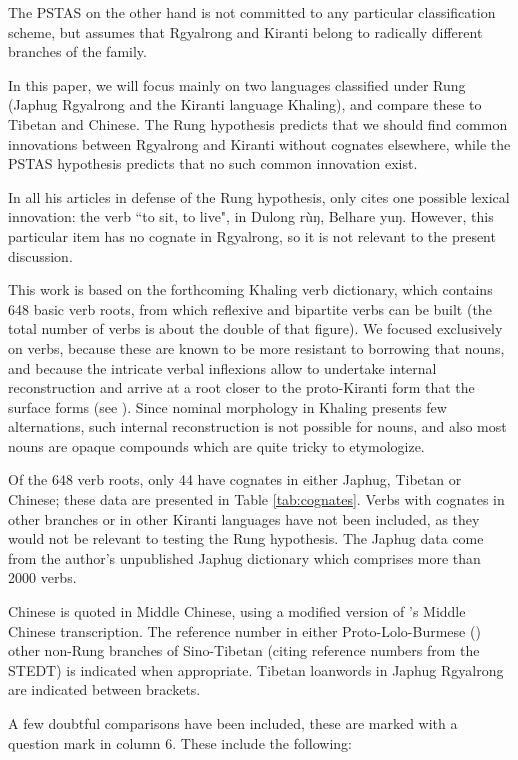 \documentclass[oldfontcommands,oneside,a4paper,11pt]{article}
\newcommand{\ipa}[1]{{\phon #1}} %
\begin{document}
The PSTAS on the other hand is not committed to any particular classification scheme, but assumes that Rgyalrong and Kiranti belong to radically different branches of the family.

In this paper, we will focus mainly on two languages classified under Rung (Japhug Rgyalrong and the Kiranti language Khaling), and compare these to Tibetan and Chinese. The Rung hypothesis predicts that we should find common innovations between Rgyalrong and Kiranti without cognates elsewhere, while the PSTAS hypothesis predicts that no such common innovation exist.

In all his articles in defense of the Rung hypothesis, \citet{lapolla14subgrouping} only cites one possible lexical innovation: the verb ``to sit, to live", in Dulong \ipa{rùŋ}, Belhare \ipa{yuŋ}. However, this particular item has no cognate in Rgyalrong, so it is not relevant to the present discussion.

This work is based on the forthcoming Khaling verb dictionary, which contains 648 basic verb roots, from which reflexive and bipartite verbs can be built (the total number of verbs is about the double of that figure). We focused exclusively on verbs, because these are known to be more resistant to borrowing that nouns, and because the intricate verbal inflexions allow to undertake internal reconstruction and arrive at a root closer to the proto-Kiranti form that the surface forms (see \citealt{jacques12khaling}). Since nominal morphology in Khaling presents few alternations, such internal reconstruction is not possible for nouns, and also most nouns are opaque compounds which are quite tricky to etymologize.

Of the 648 verb roots, only 44 have cognates in either Japhug, Tibetan or Chinese; these data are presented in Table \ref{tab:cognates}. Verbs with cognates in other branches or in other Kiranti languages have not been included, as they would not be relevant to testing the Rung hypothesis. The Japhug data come from the author's unpublished Japhug dictionary which comprises more than 2000 verbs.

Chinese is quoted in Middle Chinese, using a modified version of \citet{baxter92}'s Middle Chinese transcription. 
The reference number in either Proto-Lolo-Burmese (\citealt{bradley79}) other non-Rung branches of Sino-Tibetan (citing reference numbers from the STEDT) is indicated when appropriate. Tibetan loanwords in Japhug Rgyalrong are indicated between brackets.

A few doubtful comparisons have been included, these are marked with a question mark in column 6. These include the following:
\end{document}
